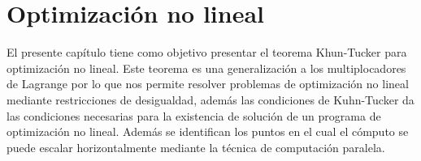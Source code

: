 
\section{Optimización no lineal}
El presente capítulo tiene como objetivo presentar el teorema
Khun-Tucker para optimización no lineal.  Este teorema es una
generalización a los multiplocadores de Lagrange por lo que nos
permite resolver problemas de optimización no lineal mediante
restricciones de desigualdad, además las condiciones de Kuhn-Tucker da
las condiciones necesarias para la existencia de solución de un
programa de optimización no lineal. Además se identifican los puntos
en el cual el cómputo se puede escalar horizontalmente mediante la
técnica de computación paralela.

